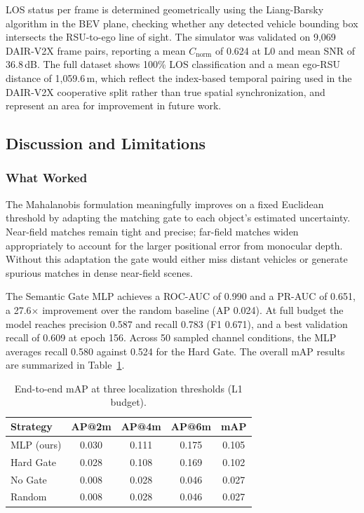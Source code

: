 \documentclass[12pt]{article}
\begin{document}
\noindent LOS status per frame is determined geometrically using the Liang-Barsky algorithm in the BEV plane, checking whether any detected vehicle bounding box intersects the RSU-to-ego line of sight. The simulator was validated on 9{,}069 DAIR-V2X frame pairs, reporting a mean $C_{\text{norm}}$ of 0.624 at L0 and mean SNR of 36.8\,dB. The full dataset shows 100\% LOS classification and a mean ego-RSU distance of 1{,}059.6\,m, which reflect the index-based temporal pairing used in the DAIR-V2X cooperative split rather than true spatial synchronization, and represent an area for improvement in future work.

\subsection{Discussion and Limitations}
\label{sec:discussion}

\subsubsection{What Worked}

The Mahalanobis formulation meaningfully improves on a fixed Euclidean threshold by adapting the matching gate to each object's estimated uncertainty. Near-field matches remain tight and precise; far-field matches widen appropriately to account for the larger positional error from monocular depth. Without this adaptation the gate would either miss distant vehicles or generate spurious matches in dense near-field scenes.

\medskip
The Semantic Gate MLP achieves a ROC-AUC of 0.990 and a PR-AUC of 0.651, a 27.6$\times$ improvement over the random baseline (AP 0.024). At full budget the model reaches precision 0.587 and recall 0.783 (F1 0.671), and a best validation recall of 0.609 at epoch 156. Across 50 sampled channel conditions, the MLP averages recall 0.580 against 0.524 for the Hard Gate. The overall mAP results are summarized in Table~\ref{tab:map_overall}.

\begin{table}[h]
\centering
\caption{End-to-end mAP at three localization thresholds (L1 budget).}
\label{tab:map_overall}
\begin{tabular}{lcccc}
\toprule
\textbf{Strategy} & \textbf{AP@2m} & \textbf{AP@4m} & \textbf{AP@6m} & \textbf{mAP} \\
\midrule
MLP (ours) & 0.030 & 0.111 & 0.175 & 0.105 \\
Hard Gate  & 0.028 & 0.108 & 0.169 & 0.102 \\
No Gate    & 0.008 & 0.028 & 0.046 & 0.027 \\
Random     & 0.008 & 0.028 & 0.046 & 0.027 \\
\bottomrule
\end{tabular}
\end{table}
\end{document}
